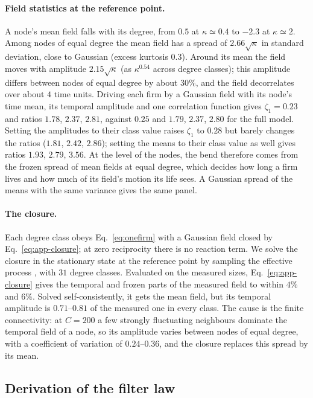 \documentclass[pre,twocolumn,superscriptaddress,nofootinbib]{revtex4-2}
\begin{document}
\paragraph{Field statistics at the reference point.}  A node's mean field falls with its degree, from $0.5$ at
$\kappa\simeq0.4$ to $-2.3$ at $\kappa\simeq2$.  Among nodes of equal degree the mean field has a spread of
$2.66\sqrt\kappa$ in standard deviation, close to Gaussian (excess kurtosis $0.3$).  Around its mean the field
moves with amplitude $2.15\sqrt\kappa$ (as $\kappa^{0.54}$ across degree classes); this amplitude differs between
nodes of equal degree by about $30\%$, and the field decorrelates over about $4$ time units.  Driving each firm
by a Gaussian field with its node's time mean, its temporal amplitude and one correlation function gives
$\zeta_1=0.23$ and ratios $1.78$, $2.37$, $2.81$, against $0.25$ and $1.79$, $2.37$, $2.80$ for the full model.
Setting the amplitudes to their class value raises $\zeta_1$ to $0.28$ but barely changes the ratios ($1.81$,
$2.42$, $2.86$); setting the means to their class value as well gives ratios $1.93$, $2.79$, $3.56$.  At the level of
the nodes, the bend therefore comes from the frozen spread of mean fields at equal degree, which decides how long a
firm lives and how much of its field's motion its life sees.  A Gaussian spread of the means with the same variance
gives the same panel.

\paragraph{The closure.}  Each degree class obeys Eq.~\eqref{eq:onefirm} with a Gaussian field closed by
Eq.~\eqref{eq:app-closure}; at zero reciprocity there is no reaction term.  We solve the closure in the stationary
state at the reference point by sampling the effective process \cite{eissfeller1992,roy2019}, with $31$ degree
classes.  Evaluated on the measured sizes, Eq.~\eqref{eq:app-closure} gives the temporal and frozen parts of the
measured field to within $4\%$ and $6\%$.  Solved self-consistently, it gets the mean field, but its temporal
amplitude is $0.71$--$0.81$ of the measured one in every class.  The cause is the finite connectivity: at $C=200$ a few strongly fluctuating neighbours
dominate the temporal field of a node, so its amplitude varies between nodes of equal degree, with a coefficient
of variation of $0.24$--$0.36$, and the closure replaces this spread by its mean.

\subsection{Derivation of the filter law}
\end{document}
